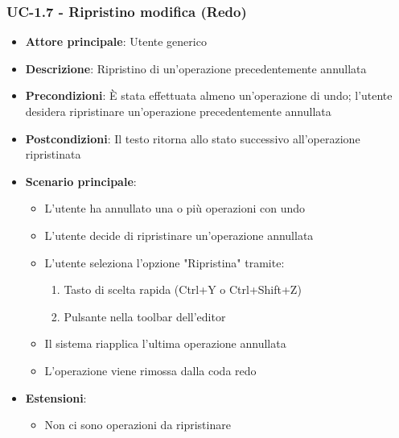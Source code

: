 \documentclass[11pt,a4paper]{article}
\begin{document}
\subsubsection{UC-1.7 - Ripristino modifica (Redo)}
\begin{itemize}
    \item \textbf{Attore principale}: Utente generico
    \item \textbf{Descrizione}: Ripristino di un'operazione precedentemente annullata
    \item \textbf{Precondizioni}: È stata effettuata almeno un'operazione di undo; l'utente desidera ripristinare un'operazione precedentemente annullata
    \item \textbf{Postcondizioni}: Il testo ritorna allo stato successivo all'operazione ripristinata
    \item \textbf{Scenario principale}:
        \begin{itemize}
            \item L'utente ha annullato una o più operazioni con undo
            \item L'utente decide di ripristinare un'operazione annullata
            \item L'utente seleziona l'opzione "Ripristina" tramite:
                \begin{enumerate}
                    \item Tasto di scelta rapida (Ctrl+Y o Ctrl+Shift+Z)
                    \item Pulsante nella toolbar dell'editor
                \end{enumerate}
            \item Il sistema riapplica l'ultima operazione annullata
            \item L'operazione viene rimossa dalla coda redo
        \end{itemize}
    \item \textbf{Estensioni}:
        \begin{itemize}
            \item Non ci sono operazioni da ripristinare
        \end{itemize}
\end{itemize}
\end{document}
